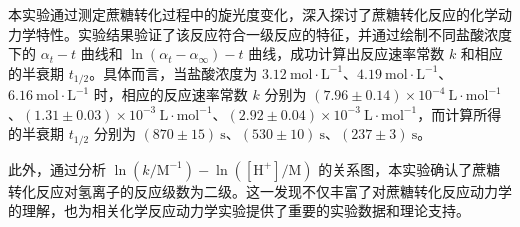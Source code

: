 本实验通过测定蔗糖转化过程中的旋光度变化，深入探讨了蔗糖转化反应的化学动力学特性。实验结果验证了该反应符合一级反应的特征，并通过绘制不同盐酸浓度下的 $\alpha_t-t$ 曲线和 $\ln\left(\alpha_t-\alpha_{\infty}\right)-t$ 曲线，成功计算出反应速率常数 $k$ 和相应的半衰期 $t_{1/2}$。具体而言，当盐酸浓度为 $3.12 \mathrm{~mol\cdot L^{-1}}$、$4.19 \mathrm{~mol\cdot L^{-1}}$、$6.16 \mathrm{~mol\cdot L^{-1}}$ 时，相应的反应速率常数 $k$ 分别为 $(7.96 \pm 0.14) \times 10^{-4} \mathrm{~L} \cdot \mathrm{mol}^{-1}$、$(1.31 \pm 0.03) \times 10^{-3} \mathrm{~L} \cdot \mathrm{mol}^{-1} $、$(2.92 \pm 0.04) \times 10^{-3} \mathrm{~L} \cdot \mathrm{mol}^{-1}$，而计算所得的半衰期 $t_{1/2}$ 分别为 $(870 \pm 15) \mathrm{~s} $、$(530 \pm 10) \mathrm{~s} $、$(237 \pm 3) \mathrm{~s}$。

此外，通过分析 $\ln\left(k/\mathrm{M}^{-1}\right)-\ln\left([\mathrm{H}^+]/\mathrm{M}\right)$ 的关系图，本实验确认了蔗糖转化反应对氢离子的反应级数为二级。这一发现不仅丰富了对蔗糖转化反应动力学的理解，也为相关化学反应动力学实验提供了重要的实验数据和理论支持。
